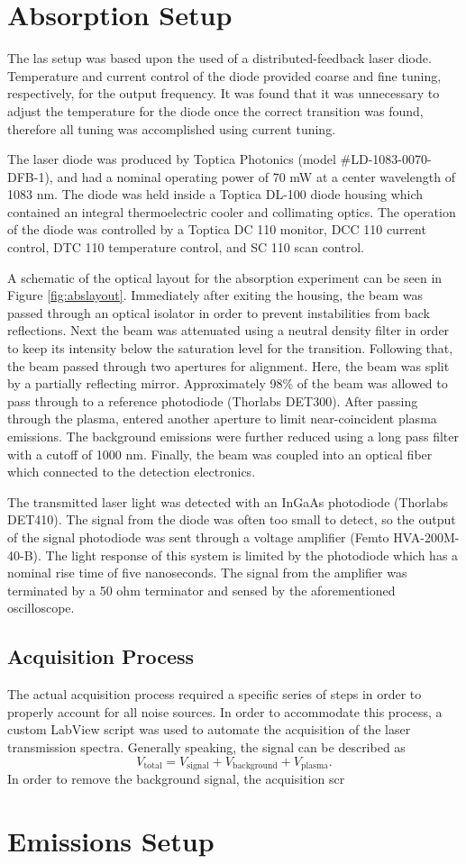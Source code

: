 \section{Absorption Setup}
The \acs{las} setup was based upon the used of a distributed-feedback
laser diode. Temperature and current control of the diode provided
coarse and fine tuning, respectively, for the output frequency. It was
found that it was unnecessary to adjust the temperature for the diode
once the correct transition was found, therefore all tuning was
accomplished using current tuning.

The laser diode was produced by Toptica Photonics (model
\#LD-1083-0070-DFB-1), and had a nominal operating power of 70 mW at a
center wavelength of 1083 nm. The diode was held inside a Toptica DL-100
diode housing which contained an integral thermoelectric cooler and
collimating optics. The operation of the diode was controlled by a
Toptica DC 110 monitor, DCC 110 current control, DTC 110 temperature
control, and SC 110 scan control.

A schematic of the optical layout for the absorption experiment can be
seen in Figure \ref{fig:abslayout}. Immediately after exiting the
housing, the beam was passed through an optical isolator in order to
prevent instabilities from back reflections. Next the beam was
attenuated using a neutral density filter in order to keep its intensity
below the saturation level for the transition. Following that, the beam
passed through two apertures for alignment. Here, the beam was split by
a partially reflecting mirror. Approximately 98\% of the beam was
allowed to pass through to a reference photodiode (Thorlabs DET300).
After passing through the plasma, entered another aperture to limit
near-coincident plasma emissions. The background emissions were further
reduced using a long pass filter with a cutoff of 1000 nm. Finally, the
beam was coupled into an optical fiber which connected to the detection
electronics.

The transmitted laser light was detected with an InGaAs photodiode
(Thorlabs DET410). The signal from the diode was often too small to
detect, so the output of the signal photodiode was sent through a
voltage amplifier (Femto HVA-200M-40-B). The light response of this
system is limited by the photodiode which has a nominal rise time of
five nanoseconds. The signal from the amplifier was terminated by a 50
ohm terminator and sensed by the aforementioned oscilloscope.

\subsection{Acquisition Process} The actual acquisition process required
a specific series of steps in order to properly account for all noise
sources. In order to accommodate this process, a custom LabView script
was used to automate the acquisition of the laser transmission spectra.
Generally speaking, the signal can be described as
\begin{equation}
  V_\mathrm{total} = V_\mathrm{signal} + V_\mathrm{background} +
                     V_\mathrm{plasma}.
\end{equation}
In order to remove the background signal, the acquisition scr

\section{Emissions Setup}
